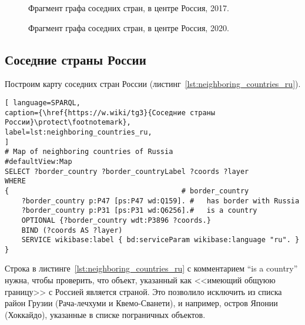 \begin{figure}
	{
		\setlength{\fboxsep}{0pt}%
		\setlength{\fboxrule}{1pt}%
	}
	\caption{Фрагмент графа соседних стран, в центре Россия, 2017.
	}%
	\label{fig:neighboring_countries_2017}%
\end{figure}

\begin{figure}
	{
		\setlength{\fboxsep}{0pt}%
		\setlength{\fboxrule}{1pt}%
	}
	\caption{Фрагмент графа соседних стран, в центре Россия, 2020.
	}%
	\label{fig:neighboring_countries_2020}%
\end{figure}

\subsection{Соседние страны России}

Построим карту соседних стран России (листинг~\ref{lst:neighboring_countries_ru}).

\begin{lstlisting}[ language=SPARQL, 
caption={\href{https://w.wiki/tg3}{Соседние страны России}\protect\footnotemark},
label=lst:neighboring_countries_ru, 
]
# Map of neighboring countries of Russia
#defaultView:Map
SELECT ?border_country ?border_countryLabel ?coords ?layer
WHERE 
{                                         # border_country
	?border_country p:P47 [ps:P47 wd:Q159]. #   has border with Russia
	?border_country p:P31 [ps:P31 wd:Q6256].#   is a country
	OPTIONAL {?border_country wdt:P3896 ?coords.}
	BIND (?coords AS ?layer)
	SERVICE wikibase:label { bd:serviceParam wikibase:language "ru". }
}
\end{lstlisting}


Строка в листинге~\ref{lst:neighboring_countries_ru} с комментарием ``is a country'' нужна, чтобы проверить, что объект, указанный как <<имеющий общуюю границу>> с Россией является страной. Это позволило исключить из списка район Грузии (Рача-лечхуми и Квемо-Сванети), и например, остров Японии (Хоккайдо), указанные в списке пограничных объектов.

